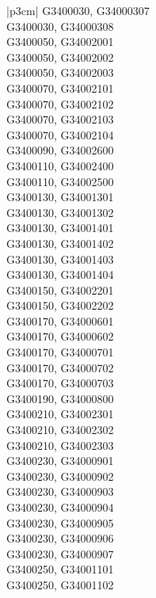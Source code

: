 \begin{customLongTable}{ |p{3cm}| }
G3400030, G34000307 \\ \hline
G3400030, G34000308 \\ \hline
G3400050, G34002001 \\ \hline
G3400050, G34002002 \\ \hline
G3400050, G34002003 \\ \hline
G3400070, G34002101 \\ \hline
G3400070, G34002102 \\ \hline
G3400070, G34002103 \\ \hline
G3400070, G34002104 \\ \hline
G3400090, G34002600 \\ \hline
G3400110, G34002400 \\ \hline
G3400110, G34002500 \\ \hline
G3400130, G34001301 \\ \hline
G3400130, G34001302 \\ \hline
G3400130, G34001401 \\ \hline
G3400130, G34001402 \\ \hline
G3400130, G34001403 \\ \hline
G3400130, G34001404 \\ \hline
G3400150, G34002201 \\ \hline
G3400150, G34002202 \\ \hline
G3400170, G34000601 \\ \hline
G3400170, G34000602 \\ \hline
G3400170, G34000701 \\ \hline
G3400170, G34000702 \\ \hline
G3400170, G34000703 \\ \hline
G3400190, G34000800 \\ \hline
G3400210, G34002301 \\ \hline
G3400210, G34002302 \\ \hline
G3400210, G34002303 \\ \hline
G3400230, G34000901 \\ \hline
G3400230, G34000902 \\ \hline
G3400230, G34000903 \\ \hline
G3400230, G34000904 \\ \hline
G3400230, G34000905 \\ \hline
G3400230, G34000906 \\ \hline
G3400230, G34000907 \\ \hline
G3400250, G34001101 \\ \hline
G3400250, G34001102 \\ \hline

\end{customLongTable}
